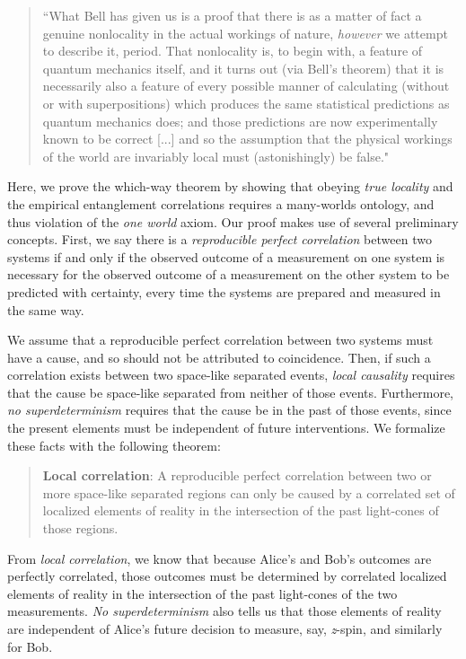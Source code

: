 \documentclass[a4paper]{article}
\begin{document}
\begin{quote}
``What Bell has given us is a proof that there is as a matter of fact a genuine nonlocality in the actual workings of nature, \textit{however} we attempt to describe it, period. That nonlocality is, to begin with, a feature
of quantum mechanics itself, and it turns out (via Bell's theorem)
that it is necessarily also a feature of every possible manner of
calculating (without or with superpositions) which produces the
same statistical predictions as quantum mechanics does; and those
predictions are now experimentally known to be correct [...] and so the assumption
that the physical workings of the world are invariably local must
(astonishingly) be false." 
\end{quote}

Here, we prove the which-way theorem by showing that obeying \textit{true locality} and the empirical entanglement correlations requires a many-worlds ontology, and thus violation of the \textit{one world} axiom. Our proof makes use of several preliminary concepts.  First, we say there is a \textit{reproducible perfect correlation} between two systems if and only if the observed outcome of a measurement on one system is necessary for the observed outcome of a measurement on the other system to be predicted with certainty, every time the systems are prepared and measured in the same way.

We assume that a reproducible perfect correlation between two systems must have a cause, and so should not be attributed to coincidence.  Then, if such a correlation exists between two space-like separated events,  \textit{local causality} requires that the cause be space-like separated from neither of those events.  Furthermore, \textit{no superdeterminism} requires that the cause be in the past of those events, since the present elements must be independent of future interventions.  We formalize these facts with the following theorem:

\begin{quote}
\textbf{Local correlation}: A reproducible perfect correlation between two or more space-like separated regions can only be caused by a correlated
set of localized elements of reality in the intersection of the past light-cones of those regions.
\end{quote}


From \textit{local correlation}, we know that because Alice's and Bob's outcomes are perfectly correlated, those outcomes must be determined by correlated localized elements of reality in the intersection of the past light-cones of the two measurements.  \textit{No superdeterminism} also tells us that those elements of reality are independent of Alice's future decision to measure, say, \textit{z}-spin, and similarly for Bob. 
\end{document}
